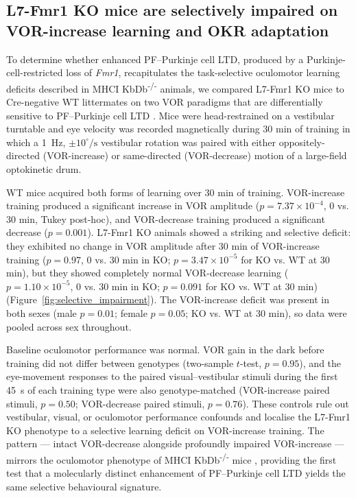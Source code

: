 \documentclass[11pt]{article}
\begin{document}
\subsection{L7-Fmr1 KO mice are selectively impaired on VOR-increase
learning and OKR adaptation}

To determine whether enhanced PF--Purkinje cell LTD, produced by a
Purkinje-cell-restricted loss of \textit{Fmr1}, recapitulates the
task-selective oculomotor learning deficits described in
MHCI KbDb\textsuperscript{-/-} animals, we compared L7-Fmr1 KO mice to
Cre-negative WT littermates on two VOR paradigms that are differentially
sensitive to PF--Purkinje cell LTD \citep{boyden2004cerebellum,
raymond2018cerebellum}. Mice were head-restrained on a vestibular turntable
and eye velocity was recorded magnetically during 30 min of training in
which a 1~Hz, $\pm 10^{\circ}/\text{s}$ vestibular rotation was paired with
either oppositely-directed (VOR-increase) or same-directed (VOR-decrease)
motion of a large-field optokinetic drum.

WT mice acquired both forms of learning over 30 min of training. VOR-increase
training produced a significant increase in VOR amplitude ($p = 7.37 \times
10^{-4}$, 0 vs. 30 min, Tukey post-hoc), and VOR-decrease training produced
a significant decrease ($p = 0.001$). L7-Fmr1 KO animals showed a striking
and selective deficit: they exhibited no change in VOR amplitude after 30
min of VOR-increase training ($p = 0.97$, 0 vs. 30 min in KO;
$p = 3.47 \times 10^{-5}$ for KO vs. WT at 30 min), but they showed
completely normal VOR-decrease learning ($p = 1.10 \times 10^{-5}$, 0 vs.
30 min in KO; $p = 0.091$ for KO vs. WT at 30 min) (Figure~\ref{fig:selective_impairment}).
The VOR-increase deficit was present in both sexes (male $p = 0.01$;
female $p = 0.05$; KO vs. WT at 30 min), so data were pooled across sex
throughout.

Baseline oculomotor performance was normal. VOR gain in the dark before
training did not differ between genotypes (two-sample $t$-test, $p = 0.95$),
and the eye-movement responses to the paired visual--vestibular stimuli
during the first 45~s of each training type were also genotype-matched
(VOR-increase paired stimuli, $p = 0.50$; VOR-decrease paired stimuli,
$p = 0.76$). These controls rule out vestibular, visual, or oculomotor
performance confounds and localise the L7-Fmr1 KO phenotype to a selective
learning deficit on VOR-increase training. The pattern --- intact
VOR-decrease alongside profoundly impaired VOR-increase --- mirrors the
oculomotor phenotype of MHCI KbDb\textsuperscript{-/-} mice
\citep{nguyenvu2017saturation}, providing the first test that a
molecularly distinct enhancement of PF--Purkinje cell LTD yields the same
selective behavioural signature.
\end{document}
